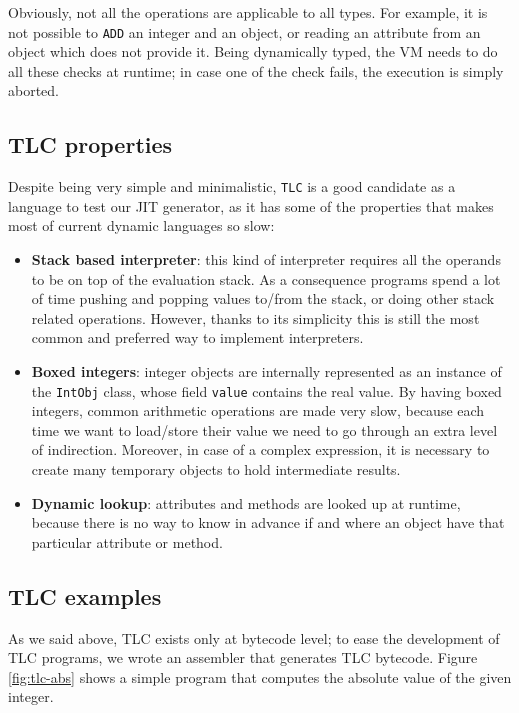 Obviously, not all the operations are applicable to all types. For example,
it is not possible to \lstinline{ADD} an integer and an object, or reading an
attribute from an object which does not provide it.  Being dynamically typed,
the VM needs to do all these checks at runtime; in case one of the check
fails, the execution is simply aborted.

\subsection{TLC properties}
\label{sec:tlc-properties}

Despite being very simple and minimalistic, \lstinline{TLC} is a good
candidate as a language to test our JIT generator, as it has some of the
properties that makes most of current dynamic languages so slow:

\begin{itemize}

\item \textbf{Stack based interpreter}: this kind of interpreter requires all the operands to be
  on top of the evaluation stack.  As a consequence programs spend a lot of
  time pushing and popping values to/from the stack, or doing other stack
  related operations.  However, thanks to its simplicity this is still the
  most common and preferred way to implement interpreters.

\item \textbf{Boxed integers}: integer objects are internally represented as
  an instance of the \lstinline{IntObj} class, whose field \lstinline{value}
  contains the real value.  By having boxed integers, common arithmetic
  operations are made very slow, because each time we want to load/store their
  value we need to go through an extra level of indirection.  Moreover, in
  case of a complex expression, it is necessary to create many temporary
  objects to hold intermediate results.

\item \textbf{Dynamic lookup}: attributes and methods are looked up at
  runtime, because there is no way to know in advance if and where an object
  have that particular attribute or method.
\end{itemize}


\subsection{TLC examples}

As we said above, TLC exists only at bytecode level; to ease the development
of TLC programs, we wrote an assembler that generates TLC bytecode. Figure \ref{fig:tlc-abs}
shows a simple program that computes the absolute value of
the given integer.

